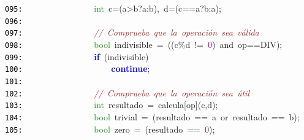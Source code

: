 \documentclass[a4paper,10pt]{scrartcl}
\begin{document}
{   \mbox{}\texttt{\textcolor{Black}{095:}} \ \ \ \ \ \ \ \ \ \ \ \ \ \ \ \ \textcolor{ForestGreen}{int}\ c\textcolor{BrickRed}{=(}a\textcolor{BrickRed}{\textgreater{}}b\textcolor{BrickRed}{?}a\textcolor{BrickRed}{:}b\textcolor{BrickRed}{),}\ d\textcolor{BrickRed}{=(}c\textcolor{BrickRed}{==}a\textcolor{BrickRed}{?}b\textcolor{BrickRed}{:}a\textcolor{BrickRed}{);} \\
   \mbox{}\texttt{\textcolor{Black}{096:}} \ \ \ \ \ \ \ \  \\
   \mbox{}\texttt{\textcolor{Black}{097:}} \ \ \ \ \ \ \ \ \ \ \ \ \ \ \ \ \textit{\textcolor{Brown}{//\ Comprueba\ que\ la\ operación\ sea\ válida}} \\
   \mbox{}\texttt{\textcolor{Black}{098:}} \ \ \ \ \ \ \ \ \ \ \ \ \ \ \ \ \textcolor{ForestGreen}{bool}\ indivisible\ \textcolor{BrickRed}{=}\ \textcolor{BrickRed}{((}c\textcolor{BrickRed}{\%}d\ \textcolor{BrickRed}{!=}\ \textcolor{Purple}{0}\textcolor{BrickRed}{)}\ \textcolor{TealBlue}{and}\ op\textcolor{BrickRed}{==}DIV\textcolor{BrickRed}{);} \\
   \mbox{}\texttt{\textcolor{Black}{099:}} \ \ \ \ \ \ \ \ \ \ \ \ \ \ \ \ \textbf{\textcolor{Blue}{if}}\ \textcolor{BrickRed}{(}indivisible\textcolor{BrickRed}{)} \\
   \mbox{}\texttt{\textcolor{Black}{100:}} \ \ \ \ \ \ \ \ \ \ \ \ \ \ \ \ \ \ \ \ \textbf{\textcolor{Blue}{continue}}\textcolor{BrickRed}{;} \\
   \mbox{}\texttt{\textcolor{Black}{101:}} \ \ \ \ \ \ \ \  \\
   \mbox{}\texttt{\textcolor{Black}{102:}} \ \ \ \ \ \ \ \ \ \ \ \ \ \ \ \ \textit{\textcolor{Brown}{//\ Comprueba\ que\ la\ operación\ sea\ útil}} \\
   \mbox{}\texttt{\textcolor{Black}{103:}} \ \ \ \ \ \ \ \ \ \ \ \ \ \ \ \ \textcolor{ForestGreen}{int}\ resultado\ \textcolor{BrickRed}{=}\ calcula\textcolor{BrickRed}{[}op\textcolor{BrickRed}{](}c\textcolor{BrickRed}{,}d\textcolor{BrickRed}{);} \\
   \mbox{}\texttt{\textcolor{Black}{104:}} \ \ \ \ \ \ \ \ \ \ \ \ \ \ \ \ \textcolor{ForestGreen}{bool}\ trivial\ \textcolor{BrickRed}{=}\ \textcolor{BrickRed}{(}resultado\ \textcolor{BrickRed}{==}\ a\ \textcolor{TealBlue}{or}\ resultado\ \textcolor{BrickRed}{==}\ b\textcolor{BrickRed}{);} \\
   \mbox{}\texttt{\textcolor{Black}{105:}} \ \ \ \ \ \ \ \ \ \ \ \ \ \ \ \ \textcolor{ForestGreen}{bool}\ zero\ \textcolor{BrickRed}{=}\ \textcolor{BrickRed}{(}resultado\ \textcolor{BrickRed}{==}\ \textcolor{Purple}{0}\textcolor{BrickRed}{);} \\
}
\end{document}
